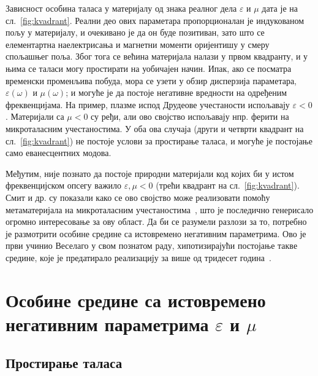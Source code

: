 \documentclass[main.tex]{subfiles}
\begin{document}
Зависност особина таласа у материјалу од знака реалног дела $\varepsilon$ и $\mu$ дата је на сл.~\ref{fig:kvadrant}. Реални део ових параметара пропорционалан је индукованом пољу у материјалу, и очекивано је да он буде позитиван, зато што се елементартна наелектрисања и магнетни моменти оријентишу у смеру спољашњег поља. Због тога се већина материјала налази у првом квадранту, и у њима се таласи могу простирати на уобичајен начин. Ипак, ако се посматра временски променљива побуда, мора се узети у обзир дисперзија параметара, $\varepsilon(\omega)$ и $\mu(\omega)$; и могуће је да постоје негативне вредности на одређеним фреквенцијама. На пример, плазме испод Друдеове учестаности испољавају $\varepsilon < 0$. Материјали са $\mu<0$ су ређи, али ово својство испољавају нпр. ферити на микроталасним учестаностима. У оба ова случаја (други и четврти квадрант на сл.~\ref{fig:kvadrant}) не постоје услови за простирање таласа, и могуће је постојање само еванесцентних модова.

Међутим, није познато да постоје природни материјали код којих би у истом фреквенцијском опсегу важило $\varepsilon,\mu < 0$ (трећи квадрант на сл.~\ref{fig:kvadrant}). Смит и др. су показали како се ово својство може реализовати помоћу метаматеријала на микроталасним учестаностима~\cite{smith:00}, што је последично генерисало огромно интересовање за ову област. Да би се разумели разлози за то, потребно је размотрити особине средине са истовремено негативним параметрима. Ово је први учинио Веселаго у свом познатом раду, хипотизирајући постојање такве средине, које је предатирало реализацију за више од тридесет година~\cite{veselago_cir}.

\section{Особине средине са истовремено негативним параметрима $\varepsilon$ и $\mu$}
\subsection{Простирање таласа}
\end{document}
